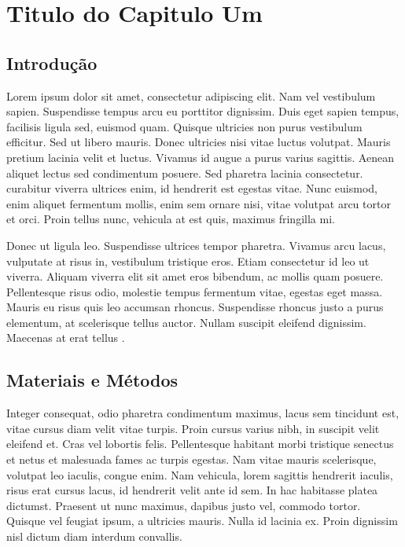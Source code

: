 \chapter{Titulo do Capitulo Um}
\label{cap:capitulo1}

\section{Introdução}

Lorem ipsum dolor sit amet, consectetur adipiscing elit. Nam vel vestibulum sapien. Suspendisse tempus arcu eu porttitor dignissim. Duis eget sapien tempus, facilisis ligula sed, euismod quam. Quisque ultricies non purus vestibulum efficitur. Sed ut libero mauris. Donec ultricies nisi vitae luctus volutpat. Mauris pretium lacinia velit et luctus. Vivamus id augue a purus varius sagittis. Aenean aliquet lectus sed condimentum posuere. Sed pharetra lacinia consectetur. \citet{DeOliveira2013,Provete2012} curabitur viverra ultrices enim, id hendrerit est egestas vitae. Nunc euismod, enim aliquet fermentum mollis, enim sem ornare nisi, vitae volutpat arcu tortor et orci. Proin tellus nunc, vehicula at est quis, maximus fringilla mi.

Donec ut ligula leo. Suspendisse ultrices tempor pharetra. Vivamus arcu lacus, vulputate at risus in, vestibulum tristique eros. Etiam consectetur id leo ut viverra. Aliquam viverra elit sit amet eros bibendum, ac mollis quam posuere. Pellentesque risus odio, molestie tempus fermentum vitae, egestas eget massa. Mauris eu risus quis leo accumsan rhoncus. Suspendisse rhoncus justo a purus elementum, at scelerisque tellus auctor. Nullam suscipit eleifend dignissim. Maecenas at erat tellus \citep{Nomura2003}.

\section{Materiais e Métodos}

Integer consequat, odio pharetra condimentum maximus, lacus sem tincidunt est, vitae cursus diam velit vitae turpis. Proin cursus varius nibh, in suscipit velit eleifend et. Cras vel lobortis felis. Pellentesque habitant morbi tristique senectus et netus et malesuada fames ac turpis egestas. Nam vitae mauris scelerisque, volutpat leo iaculis, congue enim. Nam vehicula, lorem sagittis hendrerit iaculis, risus erat cursus lacus, id hendrerit velit ante id sem. In hac habitasse platea dictumst. Praesent ut nunc maximus, dapibus justo vel, commodo tortor. Quisque vel feugiat ipsum, a ultricies mauris. Nulla id lacinia ex. Proin dignissim nisl dictum diam interdum convallis.

